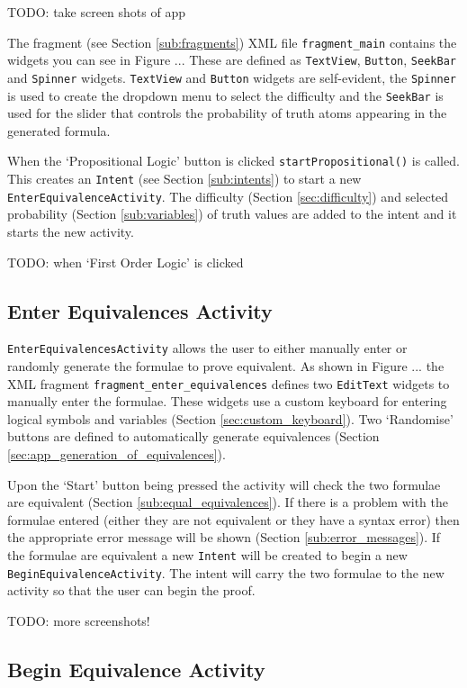 \documentclass{report}
\begin{document}
TODO: take screen shots of app

The fragment (see Section \ref{sub:fragments}) XML file {\tt fragment\_main} contains the widgets you can see in Figure ... These are defined as {\tt TextView}, {\tt Button}, {\tt SeekBar} and {\tt Spinner} widgets. {\tt TextView} and {\tt Button} widgets are self-evident, the {\tt Spinner} is used to create the dropdown menu to select the difficulty and the {\tt SeekBar} is used for the slider that controls the probability of truth atoms appearing in the generated formula.

When the `Propositional Logic' button is clicked {\tt startPropositional()} is called. This creates an {\tt Intent} (see Section \ref{sub:intents}) to start a new {\tt EnterEquivalenceActivity}. The difficulty (Section \ref{sec:difficulty}) and selected probability (Section \ref{sub:variables}) of truth values are added to the intent and it starts the new activity.

TODO: when `First Order Logic' is clicked

\subsection{Enter Equivalences Activity}

{\tt EnterEquivalencesActivity} allows the user to either manually enter or randomly generate the formulae to prove equivalent. As shown in Figure ... the XML fragment {\tt fragment\_enter\_equivalences} defines two {\tt EditText} widgets to manually enter the formulae. These widgets use a custom keyboard for entering logical symbols and variables (Section \ref{sec:custom_keyboard}). Two `Randomise' buttons are defined to automatically generate equivalences (Section \ref{sec:app_generation_of_equivalences}).

Upon the `Start' button being pressed the activity will check the two formulae are equivalent (Section \ref{sub:equal_equivalences}). If there is a problem with the formulae entered (either they are not equivalent or they have a syntax error) then the appropriate error message will be shown (Section \ref{sub:error_messages}). If the formulae are equivalent a new {\tt Intent} will be created to begin a new {\tt BeginEquivalenceActivity}. The intent will carry the two formulae to the new activity so that the user can begin the proof.

TODO: more screenshots!

\subsection{Begin Equivalence Activity}
\end{document}

